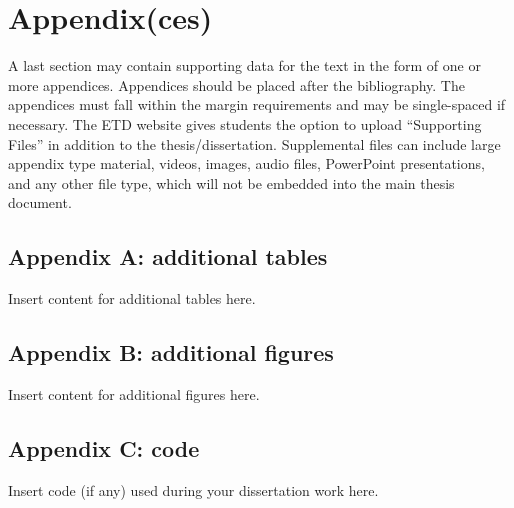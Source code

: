 \documentclass[
  12pt,
]{article}
\begin{document}



\newpage

\hypertarget{appendixces}{%
\section{Appendix(ces)}\label{appendixces}}

A last section may contain supporting data for the text in the form of
one or more appendices. Appendices should be placed after the
bibliography. The appendices must fall within the margin requirements
and may be single-spaced if necessary. The ETD website gives students
the option to upload ``Supporting Files'' in addition to the
thesis/dissertation. Supplemental files can include large appendix type
material, videos, images, audio files, PowerPoint presentations, and any
other file type, which will not be embedded into the main thesis
document.

\hypertarget{appendix-a-additional-tables}{%
\subsection{Appendix A: additional
tables}\label{appendix-a-additional-tables}}

Insert content for additional tables here.

\newpage

\hypertarget{appendix-b-additional-figures}{%
\subsection{Appendix B: additional
figures}\label{appendix-b-additional-figures}}

Insert content for additional figures here.

\newpage

\hypertarget{appendix-c-code}{%
\subsection{Appendix C: code}\label{appendix-c-code}}

Insert code (if any) used during your dissertation work here.
\end{document}
